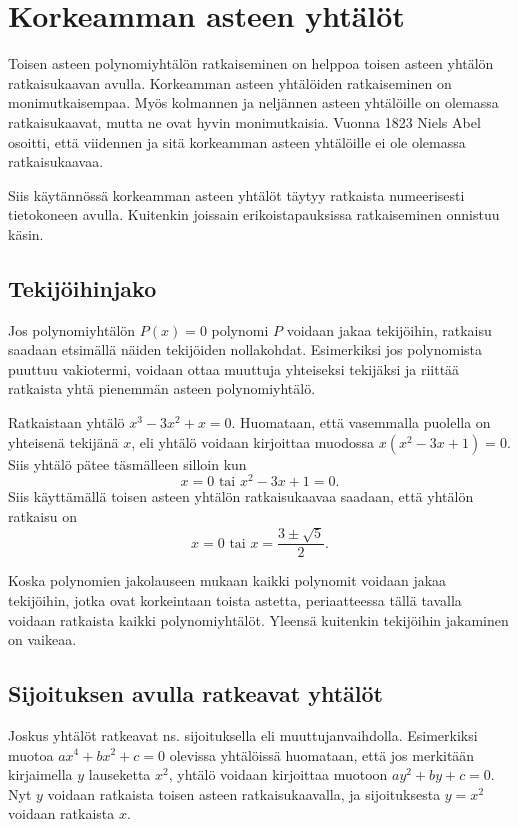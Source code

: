 \chapter{Korkeamman asteen yhtälöt}
Toisen asteen polynomiyhtälön ratkaiseminen on helppoa toisen asteen yhtälön ratkaisukaavan avulla. Korkeamman asteen yhtälöiden ratkaiseminen on monimutkaisempaa. Myös kolmannen ja neljännen asteen yhtälöille on olemassa ratkaisukaavat, mutta ne ovat hyvin monimutkaisia. Vuonna 1823 Niels Abel osoitti, että viidennen ja sitä korkeamman asteen yhtälöille ei ole olemassa ratkaisukaavaa.

Siis käytännössä korkeamman asteen yhtälöt täytyy ratkaista numeerisesti tietokoneen avulla. Kuitenkin joissain erikoistapauksissa ratkaiseminen onnistuu käsin.

\section{Tekijöihinjako}
Jos polynomiyhtälön $P(x) = 0$ polynomi $P$ voidaan jakaa tekijöihin, ratkaisu saadaan etsimällä näiden tekijöiden nollakohdat. Esimerkiksi jos polynomista puuttuu vakiotermi, voidaan ottaa muuttuja yhteiseksi tekijäksi ja riittää ratkaista yhtä pienemmän asteen polynomiyhtälö.

\begin{esimerkki}
Ratkaistaan yhtälö $x^3 - 3x^2 + x = 0$. Huomataan, että vasemmalla puolella on yhteisenä tekijänä $x$, eli yhtälö voidaan kirjoittaa muodossa $x(x^2-3x+1) = 0$. Siis yhtälö pätee täsmälleen silloin kun
\[x = 0 \text{ tai } x^2-3x+1 = 0.\]
Siis käyttämällä toisen asteen yhtälön ratkaisukaavaa saadaan, että yhtälön ratkaisu on
\[x = 0 \text{ tai } x = \frac{3\pm \sqrt{5}}{2}.\]
\end{esimerkki}

Koska polynomien jakolauseen mukaan kaikki polynomit voidaan jakaa tekijöihin, jotka ovat korkeintaan toista astetta, periaatteessa tällä tavalla voidaan ratkaista kaikki polynomiyhtälöt. Yleensä kuitenkin tekijöihin jakaminen on vaikeaa.

\section{Sijoituksen avulla ratkeavat yhtälöt}
Joskus yhtälöt ratkeavat ns. sijoituksella eli muuttujanvaihdolla. Esimerkiksi muotoa $ax^4+bx^2+c=0$ olevissa yhtälöissä huomataan, että jos merkitään kirjaimella $y$ lauseketta $x^2$, yhtälö voidaan kirjoittaa muotoon $ay^2+by+c=0$. Nyt $y$ voidaan ratkaista toisen asteen ratkaisukaavalla, ja sijoituksesta $y = x^2$ voidaan ratkaista $x$. 


